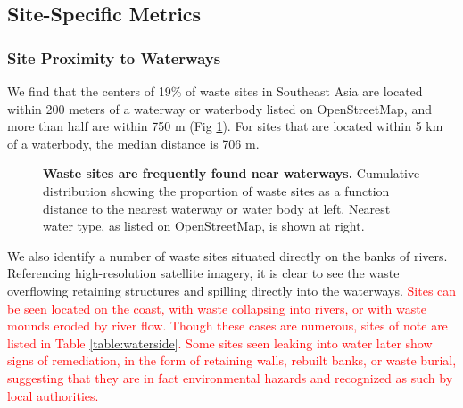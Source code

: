 \documentclass[10pt,letterpaper]{article}
\begin{document}
\subsection*{Site-Specific Metrics}
\subsubsection*{Site Proximity to Waterways}
We find that the centers of 19\% of waste sites in Southeast Asia are located within 200 meters of a waterway or waterbody listed on OpenStreetMap, and more than half are within 750 m (Fig \ref{fig:waterway_distance}). For sites that are located within 5 km of a waterbody, the median distance is 706 m.

\begin{figure}[!h]
    \caption{{\bf Waste sites are frequently found near waterways.}
    Cumulative distribution showing the proportion of waste sites as a function distance to the nearest waterway or water body at left. Nearest water type, as listed on OpenStreetMap, is shown at right.}
    \label{fig:waterway_distance}
\end{figure}

We also identify a number of waste sites situated directly on the banks of rivers. Referencing high-resolution satellite imagery, it is clear to see the waste overflowing retaining structures and spilling directly into the waterways. \textcolor{red}{Sites can be seen located on the coast, with waste collapsing into rivers, or with waste mounds eroded by river flow. Though these cases are numerous, sites of note are listed in Table \ref{table:waterside}. Some sites seen leaking into water later show signs of remediation, in the form of retaining walls, rebuilt banks, or waste burial, suggesting that they are in fact environmental hazards and recognized as such by local authorities.}
\end{document}
